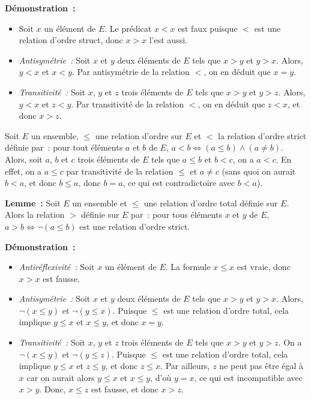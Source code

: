 \medskip

\noindent\textbf{Démonstration :}
\begin{itemize}[nosep]
    \item Soit $x$ un élément de $E$. Le prédicat $x < x$ est faux puisque $<$ est une relation d'ordre struct, donc $x > x$ l'est aussi. 
    \item \textit{Antisymétrie :} Soit $x$ et $y$ deux éléments de $E$ tels que $x > y$ et $y > x$.
        Alors, $y < x$ et $x < y$.
        Par antisymétrie de la relation $<$, on en déduit que $x = y$.
    \item \textit{Transitivité :} Soit $x$, $y$ et $z$ trois éléments de $E$ tels que $x > y$ et $y > z$.
        Alors, $y < x$ et $z < y$.
        Par transitivité de la relation $<$, on en déduit que $z < x$, et donc $x > z$.
\end{itemize}

\done

\medskip

Soit $E$ un ensemble, $\leq$ une relation d'ordre sur $E$ et $<$ la relation d'ordre strict définie par : pour tout éléments $a$ et $b$ de $E$, $a < b \Leftrightarrow (a \leq b) \wedge (a \neq b)$. 
Alors, soit $a$, $b$ et $c$ trois éléments de $E$ tels que $a \leq b$ et $b < c$, on a $a < c$. 
En effet, on a $a \leq c$ par transitivité de la relation $\leq$ et $a \neq c$ (sans quoi on aurait $b < a$, et donc $b \leq a$, donc $b = a$, ce qui est contradictoire avec $b < a$). 

\medskip

\noindent\textbf{Lemme :} Soit $E$ un ensemble et $\leq$ une relation d'ordre total définie sur $E$. 
    Alors la relation $>$ définie sur $E$ par : pour tous éléments $x$ et $y$ de $E$, $a > b \Leftrightarrow \neg (a \leq b)$ est une relation d'ordre strict. 

\medskip

\noindent\textbf{Démonstration :} 
\begin{itemize}[nosep]
    \item \textit{Antiréflexivité :} Soit $x$ un élément de $E$. 
        La formule $x \leq x$ est vraie, donc $x > x$ est fausse. 
    \item \textit{Antisymétrie :} Soit $x$ et $y$ deux éléments de $E$ tels que $x > y$ et $y > x$. 
        Alors, $\neg (x \leq y)$ et $\neg (y \leq x)$. 
        Puisque $\leq$ est une relation d'ordre total, cela implique $y \leq x$ et $x \leq y$, et donc $x = y$.
    \item \textit{Transitivité :} Soit $x$, $y$ et $z$ trois éléments de $E$ tels que $x > y$ et $y > z$. 
        On a $\neg (x \leq y)$ et $\neg (y \leq z)$. 
        Puisque $\leq$ est une relation d'ordre total, cela implique $y \leq x$ et $z \leq y$, et donc $z \leq x$. 
        Par ailleurs, $z$ ne peut pas être égal à $x$ car on aurait alors $y \leq x$ et $x \leq y$, d'où $y = x$, ce qui est incompatible avec $x > y$. 
        Donc, $x \leq z$ est fausse, et donc $x > z$.
\end{itemize}

